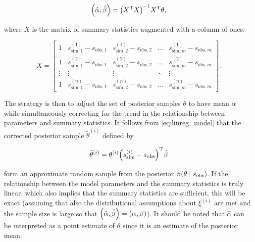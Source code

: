 \begin{equation}\label{eq:linreg_sol}
    \qty(\hat{\alpha}, \hat{\beta}) = \qty(X^{\mathrm{T}} X)^{-1} X^{\mathrm{T}} \theta,
\end{equation}

where $X$ is the matrix of summary statistics augmented with a column of ones: 

\begin{equation*}
    X = \begin{bmatrix}
    1 & s_{\mathrm{sim}, 1}^{(1)} - s_{\mathrm{obs}, 1} & s_{\mathrm{sim}, 2}^{(1)} - s_{\mathrm{obs}, 2} & \dots & s_{\mathrm{sim}, m}^{(1)} - s_{\mathrm{obs}, m}
    \\
    1 & s_{\mathrm{sim}, 1}^{(2)} - s_{\mathrm{obs}, 1} & s_{\mathrm{sim}, 2}^{(2)} - s_{\mathrm{obs}, 2} & \dots & s_{\mathrm{sim}, m}^{(2)} - s_{\mathrm{obs}, m}
    \\
    \vdots & \vdots & \vdots & \ddots & \vdots 
    \\
    1 & s_{\mathrm{sim}, 1}^{(n)} - s_{\mathrm{obs}, 1} & s_{\mathrm{sim}, 2}^{(n)} - s_{\mathrm{obs}, 2} & \dots & s_{\mathrm{sim}, m}^{(n)} - s_{\mathrm{obs}, m}
    \end{bmatrix}.
\end{equation*}

The strategy is then to adjust the set of posterior samples $\theta$ to have mean $\alpha$ while simultaneously correcting for the trend in the relationship between parameters and summary statistics. It follows from \autoref{eq:linreg_model} that the corrected posterior sample $\tilde{\theta}^{(i)}$ defined by 

\begin{equation}\label{eq:linreg_adj}
    \tilde{\theta}^{(i)} = \theta^{(i)} \qty(s_\mathrm{sim}^{(i)} - s_\mathrm{obs})^\mathrm{T} \hat{\beta}
\end{equation}

form an approximate random sample from the posterior $\pi \qty(\theta \mid s_\mathrm{obs})$. If the relationship between the model parameters and the summary statistics is truly linear, which also implies that the summary statistics are sufficient, this will be exact (assuming that also the distributional assumptions about $\xi^{(i)}$ are met and the sample size is large so that $\qty(\hat{\alpha}, \hat{\beta})=(\alpha, \beta)$). It should be noted that $\hat{\alpha}$ can be interpreted as a point estimate of $\theta$ since it is an estimate of the posterior mean.

